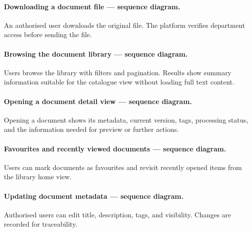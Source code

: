 
\paragraph{Downloading a document file --- sequence diagram.}
An authorised user downloads the original file. The platform verifies department
access before sending the file.

\paragraph{Browsing the document library --- sequence diagram.}
Users browse the library with filters and pagination. Results show summary
information suitable for the catalogue view without loading full text content.

\paragraph{Opening a document detail view --- sequence diagram.}
Opening a document shows its metadata, current version, tags, processing status,
and the information needed for preview or further actions.

\paragraph{Favourites and recently viewed documents --- sequence diagram.}
Users can mark documents as favourites and revisit recently opened items from the
library home view.


\paragraph{Updating document metadata --- sequence diagram.}
Authorised users can edit title, description, tags, and visibility. Changes are
recorded for traceability.

